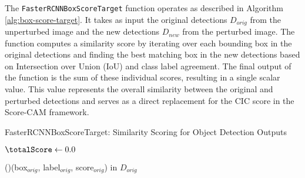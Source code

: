 The \texttt{FasterRCNNBoxScoreTarget} function operates as described in Algorithm \ref{alg:box-score-target}. It takes as input the original detections $D_{orig}$ from the unperturbed image and the new detections $D_{new}$ from the perturbed image. The function computes a similarity score by iterating over each bounding box in the original detections and finding the best matching box in the new detections based on Intersection over Union (IoU) and class label agreement.
The final output of the function is the sum of these individual scores, resulting in a single scalar value. This value represents the overall similarity between the original and perturbed detections and serves as a direct replacement for the CIC score in the Score-CAM framework.


\begin{algorithm}
    \caption{FasterRCNNBoxScoreTarget: Similarity Scoring for Object Detection Outputs}
    \label{alg:box-score-target}
    \DontPrintSemicolon
    \SetAlgoLined

    


    \BlankLine

    $\totalScore \gets 0.0$\;
    
    \ForAll(){(box$_{orig}$, label$_{orig}$, score$_{orig}$) \textup{in} $D_{orig}$}{
    }
    
    \Return{$\totalScore$}\;
\end{algorithm}

